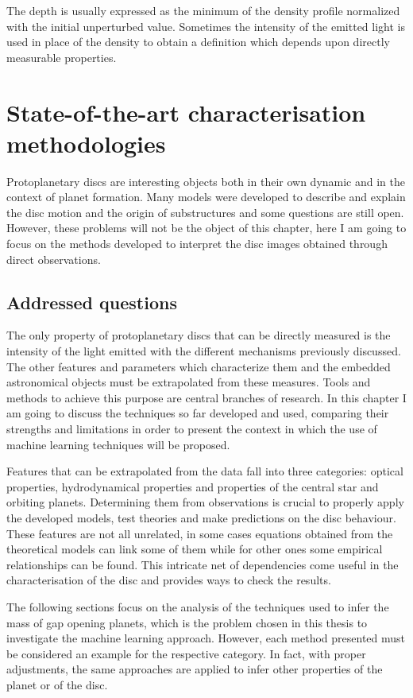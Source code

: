\documentclass[a4paper,10pt]{report}
\begin{document}
The depth is usually expressed as the minimum of the density profile normalized with the initial unperturbed value. Sometimes the intensity of the emitted light is used in place of the
density to obtain a definition which depends upon directly measurable properties.

\chapter{State-of-the-art characterisation methodologies}

Protoplanetary discs are interesting objects both in their own dynamic and
in the context of planet formation.
Many models were developed to describe and explain the disc motion and the origin of substructures and
some questions are still open. However, these problems will not be the object of this chapter, 
here I am going to focus on the methods developed to interpret the
disc images obtained through direct observations.

\section{Addressed questions}


The only property of protoplanetary discs that can be directly measured
is the intensity of the light emitted with the different mechanisms previously discussed.
The other features and parameters which characterize them and the embedded astronomical objects
must be extrapolated from these measures. 
Tools and methods to achieve this purpose are central branches of research. In this chapter I am going to discuss
the techniques so far developed and used, comparing their strengths and limitations in order to present the context
in which the use of machine learning techniques will be proposed.


Features that can be extrapolated from the data fall into three categories: optical properties, hydrodynamical properties
and properties of the central star and orbiting planets.
Determining them from observations is crucial
to properly apply the developed models, test theories and make predictions on the disc behaviour.
These features are not all unrelated, in some cases equations obtained from the theoretical
models can link some of them while for other ones some empirical relationships can be found.
This intricate net of dependencies come useful in the characterisation of the disc and provides 
ways to check the results.

The following sections focus on the analysis of the
techniques used to infer the mass of gap opening planets, which is
the problem chosen in this thesis to investigate the machine learning approach.
However, each method presented must be considered an example for the respective category. 
In fact, with proper adjustments, the same approaches are
applied to infer other properties of the planet or of the disc.
\end{document}
